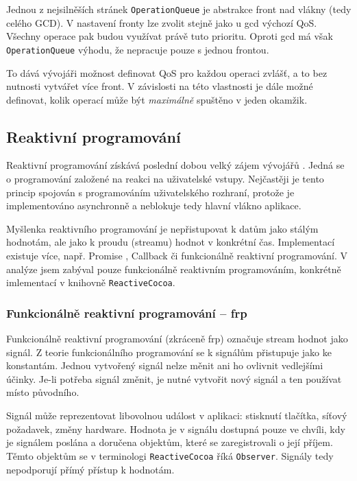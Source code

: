 Jednou z nejsilněších stránek \texttt{OperationQueue} je abstrakce front nad vlákny (tedy celého GCD).
V nastavení fronty lze zvolit stejně jako u \acrshort{gcd} výchozí QoS.
Všechny operace pak budou využívat právě tuto prioritu.
Oproti \acrshort{gcd} má však \texttt{OperationQueue} výhodu, že nepracuje pouze s jednou frontou.

To dává vývojáři možnost definovat QoS pro každou operaci zvlášť, a to bez nutnosti vytvářet více front.
V závislosti na této vlastnosti je dále možné definovat, kolik operací může být \textit{maximálně} spuštěno v jeden okamžik.

\subsection{Reaktivní programování}\label{vlakna-rac}

Reaktivní programování získává poslední dobou velký zájem vývojářů \cite{oneagency-rx}.
Jedná se o programování založené na reakci na uživatelské vstupy.
Nejčastěji je tento princip spojován s programováním uživatelského rozhraní, protože je implementováno asynchronně a neblokuje tedy hlavní vlákno aplikace.

Myšlenka reaktivního programování je nepřistupovat k datům jako stálým hodnotám, ale jako k proudu (streamu) hodnot v konkrétní čas.
Implementací existuje více, např. Promise \cite{slaks-promise}, Callback \cite{yld-callback} či funkcionálně reaktivní programování.
V analýze jsem zabýval pouze funkcionálně reaktivním programováním, konkrétně imlementací v knihovně \texttt{ReactiveCocoa}.

\subsubsection*{Funkcionálně reaktivní programování -- \acrshort{frp}}

Funkcionálně reaktivní programování (zkráceně \acrshort{frp}) označuje stream hodnot jako signál.
Z teorie funkcionálního programování se k signálům přistupuje jako ke konstantám.
Jednou vytvořený signál nelze měnit ani ho ovlivnit vedlejšími účinky.
Je-li potřeba signál změnit, je nutné vytvořit nový signál a ten používat místo původního.

Signál může reprezentovat libovolnou událost v aplikaci: stisknutí tlačítka, síťový požadavek, změny hardware.
Hodnota je v signálu dostupná pouze ve chvíli, kdy je signálem poslána a doručena objektům, které se zaregistrovali o její příjem.
Těmto objektům se v terminologi \texttt{ReactiveCocoa} říká \texttt{Observer}.
Signály tedy nepodporují přímý přístup k hodnotám.

